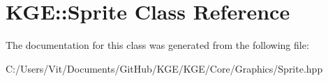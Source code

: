 \hypertarget{class_k_g_e_1_1_sprite}{\section{K\-G\-E\-:\-:Sprite Class Reference}
\label{class_k_g_e_1_1_sprite}
}


The documentation for this class was generated from the following file\-:\begin{DoxyCompactItemize}
\item 
C\-:/\-Users/\-Vit/\-Documents/\-Git\-Hub/\-K\-G\-E/\-K\-G\-E/\-Core/\-Graphics/Sprite.\-hpp\end{DoxyCompactItemize}
